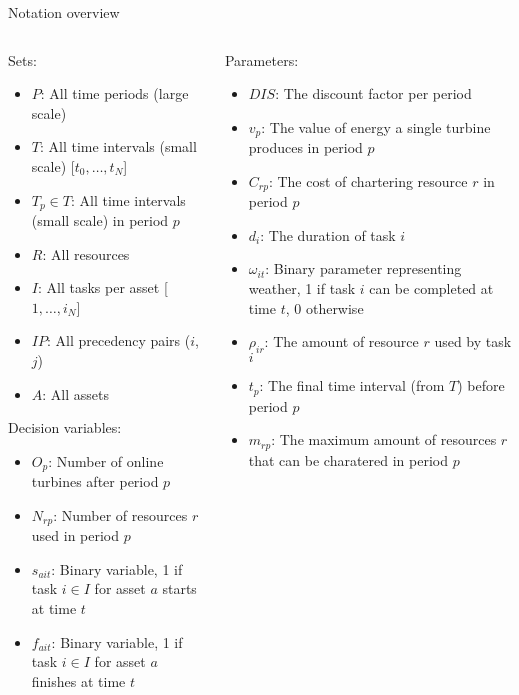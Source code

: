 \documentclass{beamer}
\begin{document}
\begin{frame}{Notation overview}
\scriptsize

\begin{columns}
\begin{column}{.48\textwidth}
Sets:
\begin{itemize}
\item $P$: All time periods (large scale)
\item $T$: All time intervals (small scale) [$t_0, \dots , t_N$]
\item $T_p \in T$: All time intervals (small scale) in period $p$
\item $R$: All resources
\item $I$:  All tasks per asset [$1, \dots , i_N$]
\item $IP$: All precedency pairs ($i$, $j$)
\item $A$: All assets
\end{itemize}

Decision variables:
\begin{itemize}
\item $O_{p}$: Number of online turbines after period $p$
\item $N_{rp}$: Number of resources $r$ used in period $p$
\item $s_{ait}$: Binary variable, 1 if task $i \in I$ for asset $a$ starts at time $t$
\item $f_{ait}$: Binary variable, 1 if task $i \in I$ for asset $a$ finishes at time $t$
\end{itemize}
\end{column}

\hfill

\begin{column}{.48\textwidth}
Parameters:
\begin{itemize}
\item $DIS$: The discount factor per period
\item $v_p$: The value of energy a single turbine produces in period $p$
\item $C_{rp}$: The cost of chartering resource $r$ in period $p$
\item $d_i$: The duration of task $i$
\item $\omega_{it}$: Binary parameter representing weather, 1 if task $i$ can be completed at time $t$, 0 otherwise
\item $\rho_{ir}$: The amount of resource $r$ used by task $i$
\item $t_p$: The final time interval (from $T$) before period $p$
\item $m_{rp}$: The maximum amount of resources $r$ that can be charatered in period $p$
\end{itemize}
\end{column}
\end{columns}

\end{frame}
\end{document}
